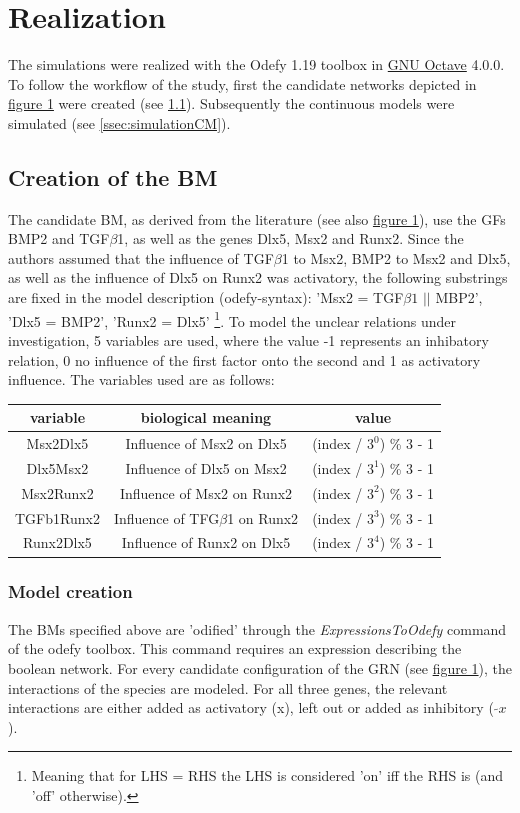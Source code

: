 \documentclass[11pt]{article}
\begin{document}
\section{Realization}
The simulations were realized with the Odefy 1.19 toolbox in \href{https://www.gnu.org/software/octave/}{GNU Octave}
4.0.0. To follow the workflow of the study, first the candidate networks depicted in \hyperref[regulatory_network]{figure 1} were created (see \ref{ssec:creation}). Subsequently the continuous models were simulated (see \ref{ssec:simulationCM}).

\subsection{Creation of the BM} \label{ssec:creation}
The candidate BM, as derived from the literature (see also \hyperref[regulatory_network]{figure 1}), use the GFs
BMP2 and TGF$\beta$1, as well as the genes Dlx5, Msx2 and Runx2.
Since the authors assumed that the influence of TGF$\beta$1 to Msx2, BMP2 to Msx2 and Dlx5, as well as the influence of Dlx5 on Runx2 was activatory, the following substrings are fixed in the model description (odefy-syntax):
'Msx2 = TGF$\beta1$ $||$ MBP2', 'Dlx5 = BMP2', 'Runx2 = Dlx5' \footnote{Meaning that for LHS = RHS the LHS is considered 'on' iff the RHS is (and 'off' otherwise).}.
To model the unclear relations under investigation, 5 variables are used, where the value -1 represents an inhibatory relation, 0 no influence of the first factor onto the second and 1 as activatory influence. The variables used are as follows:

\begin{tabular}{c c c}
\textbf{variable} & \textbf{biological meaning} & \textbf{value} \\
\hline
Msx2Dlx5 & Influence of Msx2 on Dlx5 & (index / $3^{0}$) \% 3 - 1 \\
Dlx5Msx2 &  Influence of Dlx5 on Msx2 & (index / $3^{1}$) \% 3 - 1 \\ 
Msx2Runx2 &  Influence of Msx2 on Runx2 & (index / $3^{2}$) \% 3 - 1 \\ 
TGFb1Runx2 &  Influence of TFG$\beta$1 on Runx2 & (index / $3^{3}$) \% 3 - 1 \\ 
Runx2Dlx5 &  Influence of Runx2 on Dlx5 & (index / $3^{4}$) \% 3 - 1 \\
\end{tabular}

\subsubsection{Model creation}
The BMs specified above are 'odified' through the \textit{ExpressionsToOdefy} command of the odefy toolbox. This command requires an expression describing the boolean network. For every candidate configuration of the GRN (see \hyperref[regulatory_network]{figure 1}), the interactions of the species are modeled. For all three genes, the relevant
interactions are either added as activatory (x), left out or added as inhibitory ( $\tilde{} x$).
\end{document}
